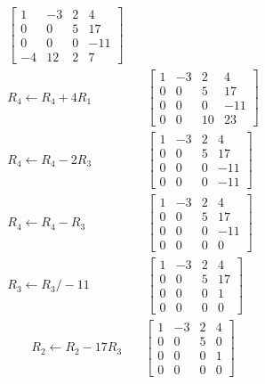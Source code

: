 \documentclass{zc-ust-hw}
\begin{document}
\begin{enumerate}
\begin{enumerate}
\begin{sol}
\begin{align}
\begin{bmatrix}
          1 & -3 & 2 & 4\\
          0 & 0 & 5 & 17\\
          0 & 0 & 0 & -11\\
          -4 & 12 & 2 & 7
        \end{bmatrix} \\
        R_4 \leftarrow R_4 + 4R_1
        &\quad
        \begin{bmatrix} 
          1 & -3 & 2 & 4\\
          0 & 0 & 5 & 17\\
          0 & 0 & 0 & -11\\
          0 & 0 & 10 & 23
        \end{bmatrix} \\
        R_4 \leftarrow R_4 - 2R_3
        &\quad
        \begin{bmatrix} 
          1 & -3 & 2 & 4\\
          0 & 0 & 5 & 17\\
          0 & 0 & 0 & -11\\
          0 & 0 & 0 & -11
        \end{bmatrix} \\
        R_4 \leftarrow R_4 - R_3
        &\quad
        \begin{bmatrix} 
          1 & -3 & 2 & 4\\
          0 & 0 & 5 & 17\\
          0 & 0 & 0 & -11\\
          0 & 0 & 0 & 0
        \end{bmatrix} \\
        R_3 \leftarrow R_3 / -11
        &\quad
        \begin{bmatrix} 
          1 & -3 & 2 & 4\\
          0 & 0 & 5 & 17\\
          0 & 0 & 0 & 1\\
          0 & 0 & 0 & 0
        \end{bmatrix}
      \end{align}
      \begin{align}
        R_2 \leftarrow R_2 - 17R_3
        &\quad
        \begin{bmatrix} 
          1 & -3 & 2 & 4\\
          0 & 0 & 5 & 0\\
          0 & 0 & 0 & 1\\
          0 & 0 & 0 & 0
        \end{bmatrix} \\

\end{align}
\end{sol}
\end{enumerate}
\end{enumerate}
\end{document}
